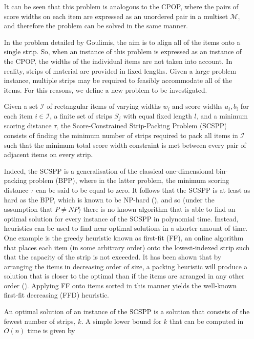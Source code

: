\documentclass[oribibl]{llncs}
\begin{document}
It can be seen that this problem is analogous to the CPOP, where the pairs of score widths on each item are expressed as an unordered pair in a multiset $\mathcal{M}$, and therefore the problem can be solved in the same manner.

In the problem detailed by Goulimis, the aim is to align all of the items onto a single strip. So, when an instance of this problem is expressed as an instance of the CPOP, the widths of the individual items are not taken into account. In reality, strips of material are provided in fixed lengths. Given a large problem instance, multiple strips may be required to feasibly accommodate all of the items. For this reasons, we define a new problem to be investigated.

\begin{definition}
	Given a set $\mathcal{I}$ of rectangular items of varying widths $w_i$ and score widths $a_i, b_i$ for each item $i \in \mathcal{I}$, a finite set of strips $S_j$ with equal fixed length $l$, and a minimum scoring distance $\tau$, the Score-Constrained Strip-Packing Problem (SCSPP) consists of finding the minimum number of strips required to pack all items in $\mathcal{I}$ such that the minimum total score width constraint is met between every pair of adjacent items on every strip.
\end{definition}

Indeed, the SCSPP is a generalisation of the classical one-dimensional bin-packing problem (BPP), where in the latter problem, the minimum scoring distance $\tau$ can be said to be equal to zero. It follows that the SCSPP is at least as hard as the BPP, which is known to be NP-hard (\citealp{garey1979}), and so (under the assumption that $P \neq NP$) there is no known algorithm that is able to find an optimal solution for every instance of the SCSPP in polynomial time. Instead, heuristics can be used to find near-optimal solutions in a shorter amount of time. One example is the greedy heuristic known as first-fit (FF), an online algorithm that places each item (in some arbitrary order) onto the lowest-indexed strip such that the capacity of the strip is not exceeded. It has been shown that by arranging the items in decreasing order of size, a packing heuristic will produce a solution that is closer to the optimal than if the items are arranged in any other order (\citealp{johnson1974fast}). Applying FF onto items sorted in this manner yields the well-known first-fit decreasing (FFD) heuristic.

An optimal solution of an instance of the SCSPP is a solution that consists of the fewest number of strips, $k$. A simple lower bound for $k$ that can be computed in $O(n)$ time is given by
\end{document}
